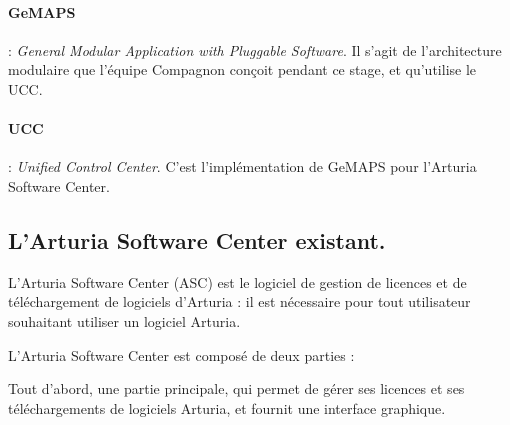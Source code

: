 \documentclass[francais]{rapportPFE}  %
\begin{document}
\paragraph{GeMAPS} : \textit{General Modular Application with Pluggable Software}. Il s'agit de l'architecture modulaire que l'équipe Compagnon conçoit pendant ce stage, et qu'utilise le UCC.
\paragraph{UCC} : \textit{Unified Control Center}. C'est l'implémentation de GeMAPS pour l'Arturia Software Center.
\subsection{L'Arturia Software Center existant.}

L'Arturia Software Center \cite{asc}
 (ASC) est le logiciel de gestion de licences et de
téléchargement de logiciels d'Arturia : il est nécessaire pour tout utilisateur
souhaitant utiliser un logiciel Arturia. 

L'Arturia Software Center est composé de deux parties : 

Tout d'abord, une partie principale, qui permet de gérer ses licences et ses téléchargements de logiciels Arturia, et fournit une interface graphique.
\end{document}
